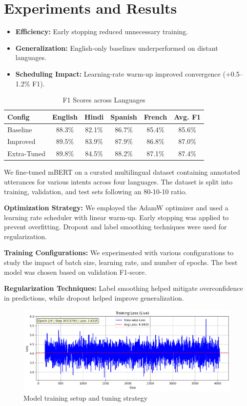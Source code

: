 \documentclass{ecai}
\begin{document}
\section{Experiments and Results}
\begin{itemize}
    \item \textbf{Efficiency:} Early stopping reduced unnecessary training.
    \item \textbf{Generalization:} English-only baselines underperformed on distant languages.
    \item \textbf{Scheduling Impact:} Learning-rate warm-up improved convergence (+0.5–1.2\% F1).
\end{itemize}

\begin{table}[H]
\centering
\caption{F1 Scores across Languages}
\begin{tabular}{lcccc|c}
\toprule
Config        & English & Hindi & Spanish & French & Avg. F1 \\
\midrule
Baseline      & 88.3\%  & 82.1\% & 86.7\%  & 85.4\% & 85.6\%  \\
Improved      & 89.5\%  & 83.9\% & 87.9\%  & 86.8\% & 87.0\%  \\
Extra-Tuned   & 89.8\%  & 84.5\% & 88.2\%  & 87.1\% & 87.4\%  \\
\bottomrule
\end{tabular}
\end{table}

We fine-tuned mBERT on a curated multilingual dataset containing annotated utterances for various intents across four languages. The dataset is split into training, validation, and test sets following an 80-10-10 ratio.

\textbf{Optimization Strategy:} We employed the AdamW optimizer and used a learning rate scheduler with linear warm-up. Early stopping was applied to prevent overfitting. Dropout and label smoothing techniques were used for regularization.

\textbf{Training Configurations:} We experimented with various configurations to study the impact of batch size, learning rate, and number of epochs. The best model was chosen based on validation F1-score.

\textbf{Regularization Techniques:} Label smoothing helped mitigate overconfidence in predictions, while dropout helped improve generalization.

\begin{figure}[h]
\centering
\includegraphics[width=0.8\linewidth]{Tuning.png}
\caption{Model training setup and tuning strategy}
\end{figure}
\end{document}
